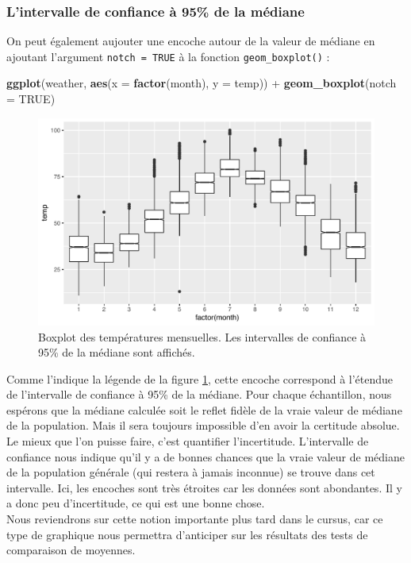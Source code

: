 \documentclass[a4paperpaper,]{article}
\newenvironment{Shaded}{\begin{snugshade}}{\end{snugshade}}
\newcommand{\DataTypeTok}[1]{\textcolor[rgb]{0.00,0.34,0.68}{#1}}
\newcommand{\KeywordTok}[1]{\textcolor[rgb]{0.12,0.11,0.11}{\textbf{#1}}}
\newcommand{\NormalTok}[1]{\textcolor[rgb]{0.12,0.11,0.11}{#1}}
\newcommand{\OperatorTok}[1]{\textcolor[rgb]{0.12,0.11,0.11}{#1}}
\newcommand{\OtherTok}[1]{\textcolor[rgb]{0.00,0.43,0.16}{#1}}
\newcommand{\StringTok}[1]{\textcolor[rgb]{0.75,0.01,0.01}{#1}}
\begin{document}
\hypertarget{lintervalle-de-confiance-a-95-de-la-mediane}{%
\subsubsection{L'intervalle de confiance à 95\% de la médiane}\label{lintervalle-de-confiance-a-95-de-la-mediane}}

On peut également aujouter une encoche autour de la valeur de médiane en ajoutant l'argument \texttt{notch\ =\ TRUE} à la fonction \texttt{geom\_boxplot()} :

\begin{Shaded}
\begin{Highlighting}[]
\KeywordTok{ggplot}\NormalTok{(weather, }\KeywordTok{aes}\NormalTok{(}\DataTypeTok{x =} \KeywordTok{factor}\NormalTok{(month), }\DataTypeTok{y =}\NormalTok{ temp)) }\OperatorTok{+}
\StringTok{  }\KeywordTok{geom_boxplot}\NormalTok{(}\DataTypeTok{notch =} \OtherTok{TRUE}\NormalTok{)}
\end{Highlighting}
\end{Shaded}

\begin{figure}[htpb]

{\centering \includegraphics[width=0.9\linewidth]{figure/notchedboxplot-1} 

}

\caption{Boxplot des températures mensuelles. Les intervalles de confiance à 95\% de la médiane sont affichés.}\label{fig:notchedboxplot}
\end{figure}



Comme l'indique la légende de la figure \ref{fig:notchedboxplot}, cette encoche correspond à l'étendue de l'intervalle de confiance à 95\% de la médiane. Pour chaque échantillon, nous espérons que la médiane calculée soit le reflet fidèle de la vraie valeur de médiane de la population. Mais il sera toujours impossible d'en avoir la certitude absolue. Le mieux que l'on puisse faire, c'est quantifier l'incertitude. L'intervalle de confiance nous indique qu'il y a de bonnes chances que la vraie valeur de médiane de la population générale (qui restera à jamais inconnue) se trouve dans cet intervalle. Ici, les encoches sont très étroites car les données sont abondantes. Il y a donc peu d'incertitude, ce qui est une bonne chose.\\
Nous reviendrons sur cette notion importante plus tard dans le cursus, car ce type de graphique nous permettra d'anticiper sur les résultats des tests de comparaison de moyennes.
\end{document}
